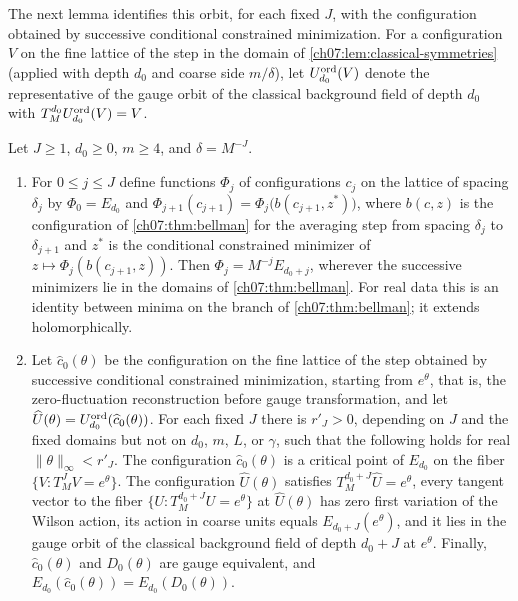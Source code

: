 The next lemma identifies this orbit, for each fixed $J$, with the configuration obtained by successive conditional constrained minimization. For a configuration $V$ on the fine lattice of the step in the domain of \cref{ch07:lem:classical-symmetries} (applied with depth $d_0$ and coarse side $m/\delta$), let $U^{\rm ord}_{d_0}(V)$ denote the representative of the gauge orbit of the classical background field of depth $d_0$ with $T_M^{d_0}U^{\rm ord}_{d_0}(V)=V$.

\begin{lemma}\label{ch08:lem:successive-minimizer-orbit}
Let $J\ge1$, $d_0\ge0$, $m\ge4$, and $\delta=M^{-J}$.
\begin{enumerate}
\item For $0\le j\le J$ define functions $\Phi_j$ of configurations $c_j$ on the lattice of spacing $\delta_j$ by $\Phi_0=E_{d_0}$ and $\Phi_{j+1}(c_{j+1})=\Phi_j\bigl(b(c_{j+1},z^*)\bigr)$, where $b(c,z)$ is the configuration of \cref{ch07:thm:bellman} for the averaging step from spacing $\delta_j$ to $\delta_{j+1}$ and $z^*$ is the conditional constrained minimizer of $z\mapsto\Phi_j(b(c_{j+1},z))$. Then $\Phi_j=M^{-j}E_{d_0+j}$, wherever the successive minimizers lie in the domains of \cref{ch07:thm:bellman}. For real data this is an identity between minima on the branch of \cref{ch07:thm:bellman}; it extends holomorphically.
\item Let $\widehat c_0(\theta)$ be the configuration on the fine lattice of the step obtained by successive conditional constrained minimization, starting from $e^\theta$, that is, the zero-fluctuation reconstruction before gauge transformation, and let $\widehat U(\theta)=U^{\rm ord}_{d_0}(\widehat c_0(\theta))$. For each fixed $J$ there is $r'_J>0$, depending on $J$ and the fixed domains but not on $d_0$, $m$, $L$, or $\gamma$, such that the following holds for real $\|\theta\|_\infty<r'_J$. The configuration $\widehat c_0(\theta)$ is a critical point of $E_{d_0}$ on the fiber $\{V:T_M^JV=e^\theta\}$. The configuration $\widehat U(\theta)$ satisfies $T_M^{d_0+J}\widehat U=e^\theta$, every tangent vector to the fiber $\{U:T_M^{d_0+J}U=e^\theta\}$ at $\widehat U(\theta)$ has zero first variation of the Wilson action, its action in coarse units equals $E_{d_0+J}(e^\theta)$, and it lies in the gauge orbit of the classical background field of depth $d_0+J$ at $e^\theta$. Finally, $\widehat c_0(\theta)$ and $D_0(\theta)$ are gauge equivalent, and $E_{d_0}(\widehat c_0(\theta))=E_{d_0}(D_0(\theta))$.
\end{enumerate}
\end{lemma}

